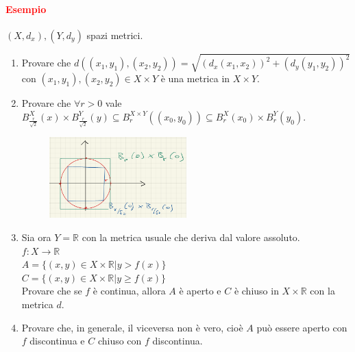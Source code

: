 \documentclass{article}
\newcommand{\R}{\mathbb{R}}
\begin{document}
\paragraph{\textcolor{red}{Esempio}}
$(X,d_x),(Y,d_y)$ spazi metrici.
\begin{enumerate}
    \item Provare che $d((x_1,y_1),(x_2,y_2))= \sqrt{(d_x(x_1,x_2))^2+(d_y(y_1,y_2))^2}$ con $(x_1, y_1),(x_2,y_2)\in X \times Y$ è una metrica in $X\times Y$.
    \item Provare che $\forall r >0$ vale\\
        $B_{\frac{r}{\sqrt{2}}}^{X}(x) \times B_{\frac{r}{\sqrt{2}}}^{Y}(y) \subseteq B_{r}^{X\times Y}((x_0,y_0))\subseteq B_{r}^{X}(x_0)\times B_{r}^{Y}(y_0)$.
        \begin{figure}[!h]
            \centering
            \includegraphics[width=0.5\textwidth]{Screenshot from 2023-03-28 21-59-39.png}
        \end{figure}
    \item Sia ora $Y=\R$ con la metrica usuale che deriva dal valore assoluto.\\
        $f:X \rightarrow \R$\\
        $A=\{  (x,y)\in X\times \R |y>f(x) \}$\\
        $C=\{  (x,y)\in X\times\R |y \geq f(x) \}$\\
        Provare che se $f $ è continua, allora $A$ è aperto e $C$ è chiuso in $X \times \R$ con la metrica $d$.
    \item Provare che, in generale, il viceversa non è vero, cioè $A$ può essere aperto con $f$ discontinua e $C$ chiuso con $f$ discontinua.
\end{enumerate}
\end{document}
